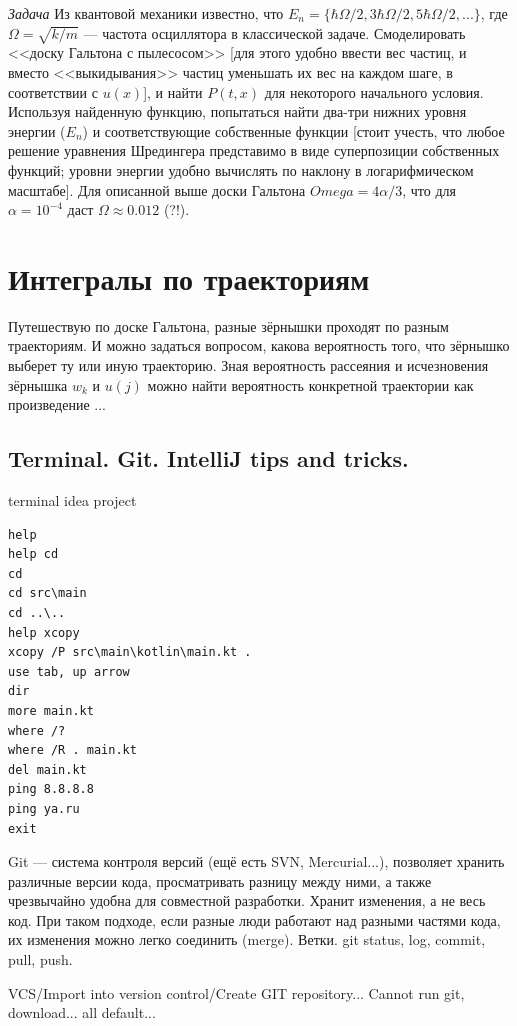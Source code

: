 \documentclass{book}
\begin{document}
\textit{Задача}
Из квантовой механики известно, что $E_n = \{\hbar \Omega / 2, 3 \hbar \Omega / 2, 5 \hbar \Omega /
2, ...\}$, где $\Omega = \sqrt{k / m}$ --- частота осциллятора в классической задаче. Смоделировать
<<доску Гальтона с пылесосом>> [для этого удобно ввести вес частиц, и вместо <<выкидывания>> частиц
уменьшать их вес на каждом шаге, в соответствии с $u(x)$], и найти $P(t, x)$ для некоторого
начального условия.  Используя найденную функцию, попытаться найти два-три нижних уровня энергии
($E_n$) и соответствующие собственные функции [стоит учесть, что любое решение уравнения Шредингера
представимо в виде суперпозиции собственных функций; уровни энергии удобно вычислять по наклону в
логарифмическом масштабе]. Для описанной выше доски Гальтона $Omega = 4 \alpha / 3$, что для
$\alpha = 10^{-4}$ даст $\Omega \approx 0.012$ (?!).

\section{Интегралы по траекториям}

Путешествую по доске Гальтона, разные зёрнышки проходят по разным траекториям. И можно задаться
вопросом, какова вероятность того, что зёрнышко выберет ту или иную траекторию. Зная вероятность
рассеяния и исчезновения зёрнышка $w_k$ и $u(j)$ можно найти вероятность конкретной траектории как
произведение ...

\subsection{Terminal. Git. IntelliJ tips and tricks.}

terminal idea project
\begin{verbatim}
help
help cd
cd
cd src\main
cd ..\..
help xcopy
xcopy /P src\main\kotlin\main.kt .
use tab, up arrow
dir
more main.kt
where /?
where /R . main.kt
del main.kt
ping 8.8.8.8
ping ya.ru
exit
\end{verbatim}

Git --- система контроля версий (ещё есть SVN, Mercurial...), позволяет хранить различные версии
кода, просматривать разницу между ними, а также чрезвычайно удобна для совместной разработки.
Хранит изменения, а не весь код. При таком подходе, если разные люди работают над разными частями
кода, их изменения можно легко соединить (merge). Ветки. git status, log, commit, pull, push.

VCS/Import into version control/Create GIT repository...
Cannot run git, download...
all default...
\end{document}
